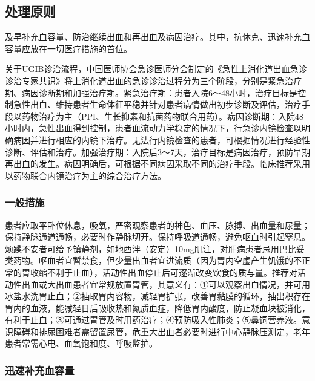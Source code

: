 \subsection{处理原则}

及早补充血容量、防治继续出血和再出血及病因治疗。其中，抗休克、迅速补充血容量应放在一切医疗措施的首位。

关于UGIB诊治流程，中国医师协会急诊医师分会制定的《急性上消化道出血急诊诊治专家共识》将上消化道出血的急诊诊治过程分为三个阶段，分别是紧急治疗期、病因诊断期和加强治疗期。紧急治疗期：患者入院6～48小时，治疗目标是控制急性出血、维持患者生命体征平稳并针对患者病情做出初步诊断及评估，治疗手段以药物治疗为主（PPI、生长抑素和抗菌药物联合用药）。病因诊断期：入院48小时内，急性出血得到控制，患者血流动力学稳定的情况下，行急诊内镜检查以明确病因并进行相应的内镜下治疗。无法行内镜检查的患者，可根据情况进行经验性诊断、评估和治疗。加强治疗期：入院后3～7天，治疗目标是病因治疗，预防早期再出血的发生。病因明确后，可根据不同病因采取不同的治疗手段。临床推荐采用以药物联合内镜治疗为主的综合治疗方法。

\subsubsection{一般措施}

患者应取平卧位休息，吸氧，严密观察患者的神色、血压、脉搏、出血量和尿量；保持静脉通道通畅，必要时作静脉切开。保持呼吸道通畅，避免呕血时引起窒息。烦躁不安者可给予镇静剂，如地西泮（安定）10mg肌注，对肝病患者忌用巴比妥类药物。呕血者宜暂禁食，但少量出血者宜进流质（因为胃内空虚产生饥饿的不正常的胃收缩不利于止血），活动性出血停止后可逐渐改变饮食的质与量。推荐对活动性出血或大出血患者宜常规放置胃管，其意义有：①可以观察出血情况，并可用冰盐水洗胃止血；②抽取胃内容物，减轻胃扩张，改善胃黏膜的循环，抽出积存在胃内的血液，能减轻日后吸收热和氮质血症，降低胃内酸度，防止凝血块被消化，有利于止血；③可通过胃管及时用药治疗；④预防吸入性肺炎；⑤鼻饲营养液。意识障碍和排尿困难者需留置尿管，危重大出血者必要时进行中心静脉压测定，老年患者常需心电、血氧饱和度、呼吸监护。

\subsubsection{迅速补充血容量}

